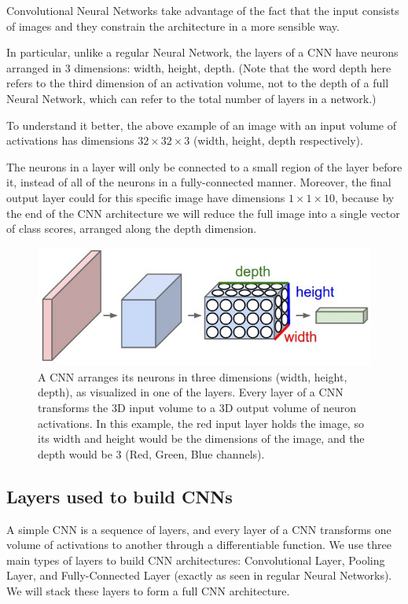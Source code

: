 \documentclass[%
oneside,                 %
final,                   %
10pt]{article}
\begin{document}
Convolutional Neural Networks take advantage of the fact that the
input consists of images and they constrain the architecture in a more
sensible way. 

In particular, unlike a regular Neural Network, the
layers of a CNN have neurons arranged in 3 dimensions: width,
height, depth. (Note that the word depth here refers to the third
dimension of an activation volume, not to the depth of a full Neural
Network, which can refer to the total number of layers in a network.)

To understand it better, the above example of an image 
with an input volume of
activations has dimensions $32\times 32\times 3$ (width, height,
depth respectively). 

The neurons in a layer will
only be connected to a small region of the layer before it, instead of
all of the neurons in a fully-connected manner. Moreover, the final
output layer could  for this specific image have dimensions $1\times 1 \times 10$, 
because by the
end of the CNN architecture we will reduce the full image into a
single vector of class scores, arranged along the depth
dimension. 


\begin{figure}[!ht]  %
  \centerline{\includegraphics[width=0.6\linewidth]{figslides/cnn.jpeg}}
  \caption{
  A CNN arranges its neurons in three dimensions (width, height, depth), as visualized in one of the layers. Every layer of a CNN transforms the 3D input volume to a 3D output volume of neuron activations. In this example, the red input layer holds the image, so its width and height would be the dimensions of the image, and the depth would be 3 (Red, Green, Blue channels).
  }
\end{figure}




\subsection{Layers used to build CNNs}


A simple CNN is a sequence of layers, and every layer of a CNN
transforms one volume of activations to another through a
differentiable function. We use three main types of layers to build
CNN architectures: Convolutional Layer, Pooling Layer, and
Fully-Connected Layer (exactly as seen in regular Neural Networks). We
will stack these layers to form a full CNN architecture.
\end{document}
